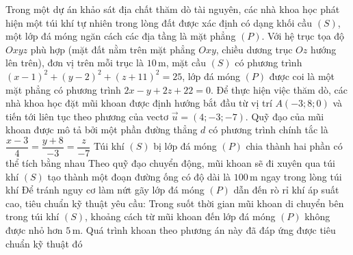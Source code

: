 \begin{ex}%
	Trong một dự án khảo sát địa chất thăm dò tài nguyên, các nhà khoa học phát hiện một túi khí tự nhiên trong lòng đất được xác định có dạng khối cầu $(S)$, một lớp đá móng ngăn cách các địa tầng là mặt phẳng $(P)$. Với hệ trục tọa độ $Oxyz$ phù hợp (mặt đất nằm trên mặt phẳng $Oxy$, chiều dương trục $Oz$ hướng lên trên), đơn vị trên mỗi trục là $10$\,m, mặt cầu $(S)$ có phương trình $(x - 1)^2 + (y - 2)^2 + (z + 11)^2 = 25$, lớp đá móng $(P)$ được coi là một mặt phẳng có phương trình $2x - y + 2z + 22 = 0$. Để thực hiện việc thăm dò, các nhà khoa học đặt mũi khoan được định hướng bắt đầu từ vị trí $A(-3;8;0)$ và tiến tới liên tục theo phương của vectơ $\vec{u} = (4;-3;-7)$.
	\choiceTF
		{Quỹ đạo của mũi khoan được mô tả bởi một phần đường thẳng $d$ có phương trình chính tắc là $\dfrac{x - 3}{4} = \dfrac{y + 8}{-3} = \dfrac{z}{-7}$}
		{\True Túi khí $(S)$ bị lớp đá móng $(P)$ chia thành hai phần có thể tích bằng nhau}
		{Theo quỹ đạo chuyển động, mũi khoan sẽ đi xuyên qua túi khí $(S)$ tạo thành một đoạn đường ống có độ dài là $100$\,m ngay trong lòng túi khí}
		{\True Để tránh nguy cơ làm nứt gãy lớp đá móng $(P)$ dẫn đến rò rỉ khí áp suất cao, tiêu chuẩn kỹ thuật yêu cầu: Trong suốt thời gian mũi khoan di chuyển bên trong túi khí $(S)$, khoảng cách từ mũi khoan đến lớp đá móng $(P)$ không được nhỏ hơn $5$\,m. Quá trình khoan theo phương án này đã đáp ứng được tiêu chuẩn kỹ thuật đó}
\end{ex}
